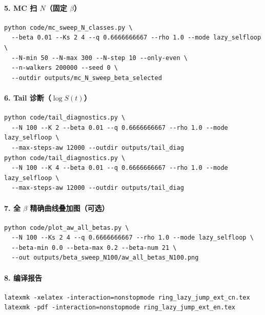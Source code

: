 \paragraph{5. MC 扫 \texorpdfstring{$N$}{N}（固定 \texorpdfstring{$\beta$}{beta}）}
\begin{verbatim}
python code/mc_sweep_N_classes.py \
  --beta 0.01 --Ks 2 4 --q 0.6666666667 --rho 1.0 --mode lazy_selfloop \
  --N-min 50 --N-max 300 --N-step 10 --only-even \
  --n-walkers 200000 --seed 0 \
  --outdir outputs/mc_N_sweep_beta_selected
\end{verbatim}

\paragraph{6. Tail 诊断（\texorpdfstring{$\log S(t)$}{log S(t)}）}
\begin{verbatim}
python code/tail_diagnostics.py \
  --N 100 --K 2 --beta 0.01 --q 0.6666666667 --rho 1.0 --mode lazy_selfloop \
  --max-steps-aw 12000 --outdir outputs/tail_diag
python code/tail_diagnostics.py \
  --N 100 --K 4 --beta 0.01 --q 0.6666666667 --rho 1.0 --mode lazy_selfloop \
  --max-steps-aw 12000 --outdir outputs/tail_diag
\end{verbatim}

\paragraph{7. 全 \texorpdfstring{$\beta$}{beta} 精确曲线叠加图（可选）}
\begin{verbatim}
python code/plot_aw_all_betas.py \
  --N 100 --Ks 2 4 --q 0.6666666667 --rho 1.0 --mode lazy_selfloop \
  --beta-min 0.0 --beta-max 0.2 --beta-num 21 \
  --out outputs/beta_sweep_N100/aw_all_betas_N100.png
\end{verbatim}

\paragraph{8. 编译报告}
\begin{verbatim}
latexmk -xelatex -interaction=nonstopmode ring_lazy_jump_ext_cn.tex
latexmk -pdf -interaction=nonstopmode ring_lazy_jump_ext_en.tex
\end{verbatim}
